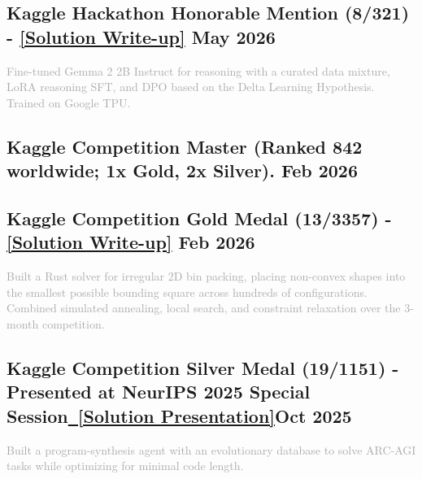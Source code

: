 \vspace{0.3em}
\subsection{{Kaggle Hackathon Honorable Mention
 (8/321) - \href{https://www.kaggle.com/competitions/google-tunix-hackathon/writeups/new-writeup-1763082571151}{[Solution Write-up]} \hfill May 2026}}
\textcolor{darkgray}{
Fine-tuned Gemma 2 2B Instruct for reasoning with a curated data mixture, LoRA reasoning SFT, and DPO based on the Delta Learning Hypothesis. Trained on Google TPU.
}
\vspace{0.3em}

\subsection{{Kaggle Competition Master (Ranked 842 worldwide; 1x Gold, 2x Silver). \hfill Feb 2026}}
\vspace{0.3em}
\subsection{{Kaggle Competition Gold Medal (13/3357) - \href{https://www.kaggle.com/competitions/santa-2025/writeups/13th-place-santa25-billiard-customized-sparrow}{[Solution Write-up]} \hfill Feb 2026}}
\textcolor{darkgray}{
Built a Rust solver for irregular 2D bin packing, placing non-convex shapes into the smallest possible bounding square across hundreds of configurations. Combined simulated annealing, local search, and constraint relaxation over the 3-month competition.
}
\vspace{0.3em}
\subsection{{Kaggle Competition Silver Medal (19/1151) - Presented at NeurIPS 2025 Special Session\href{https://docs.google.com/presentation/d/1jtS-zV4XkGeB7G2ntViCOWWPcVVSkO6GbkqC7OnXPy0/edit?usp=sharing}{\ [Solution Presentation]}\hfill Oct 2025}}
\textcolor{darkgray}{
Built a program-synthesis agent with an evolutionary database to solve ARC-AGI tasks while optimizing for minimal code length.}
\vspace{0.3em}

